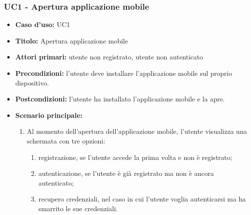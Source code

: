 \documentclass[casi-duso]{subfiles}
\begin{document}
\subsubsection{UC1 - Apertura applicazione mobile}
\label{subsub:uc1utente}
\begin{itemize}
  \item \textbf{Caso d’uso:} UC1 
  \item \textbf{Titolo:} Apertura applicazione mobile
  \item \textbf{Attori primari:} utente non registrato, utente non autenticato
  \item \textbf{Precondizioni:} l'utente deve installare l'applicazione mobile sul proprio dispositivo.
  \item \textbf{Postcondizioni:} l'utente ha installato l'applicazione mobile e la apre.
  \item \textbf{Scenario principale:} 
  \begin{enumerate}
    \item Al momento dell'apertura dell'applicazione mobile, l'utente visualizza una schermata con tre opzioni:
    \begin{enumerate}
      \item registrazione, se l'utente accede la prima volta e non è registrato;
      \item autenticazione, se l'utente è già registrato ma non è ancora autenticato;
      \item recupero credenziali, nel caso in cui l'utente voglia autenticarsi ma ha smarrito le sue credenziali.
    \end{enumerate}
  \end{enumerate}   
\end{itemize}

\end{document}
